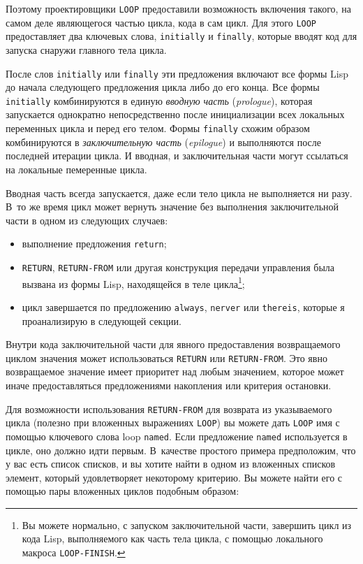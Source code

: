 Поэтому проектировщики \lstinline{LOOP} предоставили возможность включения такого, на самом
деле являющегося частью цикла, кода в сам цикл. Для этого \lstinline{LOOP} предоставляет два
ключевых слова, \lstinline{initially} и \lstinline{finally}, которые вводят код для запуска снаружи
главного тела цикла.

После слов \lstinline{initially} или \lstinline{finally} эти предложения включают все формы Lisp до
начала следующего предложения цикла либо до его конца. Все формы \lstinline{initially}
комбинируются в единую \textit{вводную часть} (\textit{prologue}), которая запускается
однократно непосредственно после инициализации всех локальных переменных цикла и перед его
телом. Формы \lstinline{finally} схожим образом комбинируются в \textit{заключительную часть}
(\textit{epilogue}) и выполняются после последней итерации цикла. И вводная, и
заключительная части могут ссылаться на локальные пемеренные цикла.

Вводная часть всегда запускается, даже если тело цикла не выполняется ни разу. В~то же
время цикл может вернуть значение без выполнения заключительной части в одном из следующих
случаев:
\begin{itemize}
\item выполнение предложения \lstinline{return};
\item \lstinline{RETURN}, \lstinline{RETURN-FROM} или другая конструкция передачи управления
  была вызвана из формы Lisp, находящейся в теле цикла\footnote{Вы можете нормально, с
    запуском заключительной части, завершить цикл из кода Lisp, вы\-пол\-няе\-мо\-го как часть
    тела цикла, с помощью локального макроса \lstinline{LOOP-FINISH}.}\hspace{\footnotenegspace};
\item цикл завершается по предложению \lstinline{always}, \lstinline{nerver} или \lstinline{thereis},
  которые я проанализирую в следующей секции.
\end{itemize}

Внутри кода заключительной части для явного предоставления возвращаемого циклом значения
может использоваться \lstinline{RETURN} или \lstinline{RETURN-FROM}. Это явно возвращаемое
значение имеет приоритет над любым значением, которое может иначе предоставляться
предложениями накопления или критерия остановки.

Для возможности использования \lstinline{RETURN-FROM} для возврата из указываемого цикла
(полезно при вложенных выражениях \lstinline{LOOP}) вы можете дать \lstinline{LOOP} имя с
помощью ключевого слова loop \lstinline{named}. Если предложение \lstinline{named} используется в
цикле, оно должно идти первым. В~качестве простого примера предположим, что у вас есть
список списков, и вы хотите найти в одном из вложенных списков элемент, который
удовлетворяет некоторому критерию. Вы можете найти его с помощью пары вложенных циклов
подобным образом:

